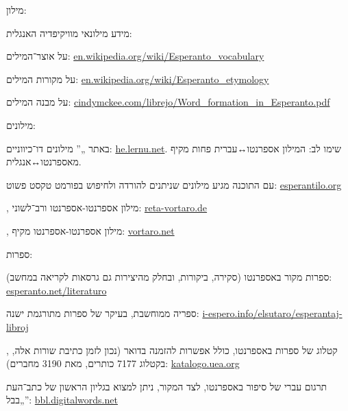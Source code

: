 מילון:
\begin{compactitem}
\item מידע מילונאי מוויקיפדיה האנגלית:
	\begin{compactitem}
	\item על אוצר־המילים: \url{en.wikipedia.org/wiki/Esperanto_vocabulary}
	\item על מקורות המילים: \url{en.wikipedia.org/wiki/Esperanto_etymology}
	\end{compactitem}
\item על מבנה המילים: \url{cindymckee.com/librejo/Word_formation_in_Esperanto.pdf}
\item מילונים:
	\begin{compactitem}
	\item באתר „” מילונים דו־כיווניים: \url{he.lernu.net}. שימו לב: המילון אספרנטו{↔}עברית פחות מקיף מאספרנטו{↔}אנגלית.
	\item עם התוכנה  מגיע מילונים שניתנים להורדה ולחיפוש בפורמט טקסט פשוט: \url{esperantilo.org}
	\item {}, מילון אספרנטו-אספרנטו ורב־לשוני: \url{reta-vortaro.de}
	\item {}, מילון אספרנטו-אספרנטו מקיף: \url{vortaro.net}
	\end{compactitem}
\end{compactitem}

ספרות:
\begin{compactitem}
\item ספרות מקור באספרנטו (סקירה, ביקורות, ובחלק מהיצירות גם גרסאות לקריאה במחשב): \url{esperanto.net/literaturo}
\item ספריה ממוחשבת, בעיקר של ספרות מתורגמת ישנה: \url{i-espero.info/elsutaro/esperantaj-libroj}
\item {}, קטלוג של ספרות באספרנטו, כולל אפשרות להזמנה בדואר (נכון לזמן כתיבת שורות אלה, בקטלוג 7177 כותרים, מאת 3190 מחברים): \url{katalogo.uea.org}
\item תרגום עברי של סיפור באספרנטו, לצד המקור, ניתן למצוא בגליון הראשון של כתב־העת „בבל”: \url{bbl.digitalwords.net}
\end{compactitem}

